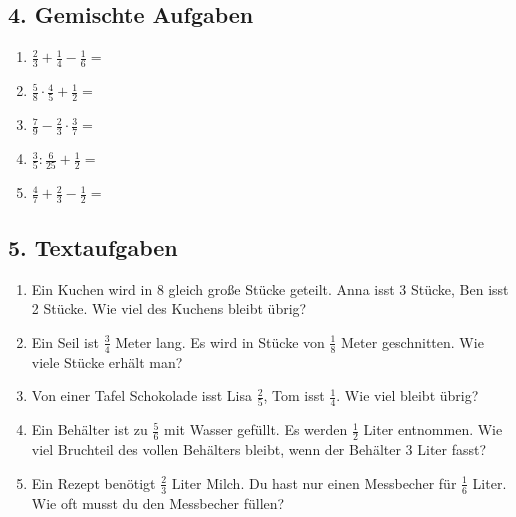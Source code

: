 \subsection*{4. Gemischte Aufgaben}
\begin{enumerate}[label=\alph*)]
    \item \( \frac{2}{3} + \frac{1}{4} - \frac{1}{6} = \)
    \item \( \frac{5}{8} \cdot \frac{4}{5} + \frac{1}{2} = \)
    \item \( \frac{7}{9} - \frac{2}{3} \cdot \frac{3}{7} = \)
    \item \( \frac{3}{5} : \frac{6}{25} + \frac{1}{2} = \)
    \item \( \frac{4}{7} + \frac{2}{3} - \frac{1}{2} = \)
\end{enumerate}

\subsection*{5. Textaufgaben}
\begin{enumerate}[label=\alph*)]
    \item Ein Kuchen wird in 8 gleich große Stücke geteilt. Anna isst 3 Stücke, Ben isst 2 Stücke. Wie viel des Kuchens bleibt übrig?
    \item Ein Seil ist $\frac{3}{4}$ Meter lang. Es wird in Stücke von $\frac{1}{8}$ Meter geschnitten. Wie viele Stücke erhält man?
    \item Von einer Tafel Schokolade isst Lisa $\frac{2}{5}$, Tom isst $\frac{1}{4}$. Wie viel bleibt übrig?
    \item Ein Behälter ist zu $\frac{5}{6}$ mit Wasser gefüllt. Es werden $\frac{1}{2}$ Liter entnommen. Wie viel Bruchteil des vollen Behälters bleibt, wenn der Behälter 3 Liter fasst?
    \item Ein Rezept benötigt $\frac{2}{3}$ Liter Milch. Du hast nur einen Messbecher für $\frac{1}{6}$ Liter. Wie oft musst du den Messbecher füllen?
\end{enumerate}
